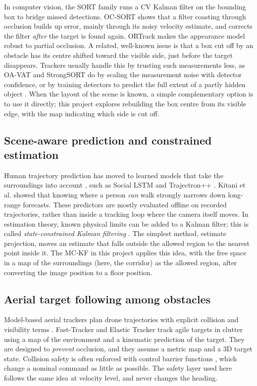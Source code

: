 \documentclass[12pt,a4paper]{article}
\begin{document}
In computer vision, the SORT family \cite{r19,r20,r21} runs a CV Kalman filter on the bounding box to bridge missed detections. OC-SORT \cite{r22} shows that a filter coasting through occlusion builds up error, mainly through its noisy velocity estimate, and corrects the filter \emph{after} the target is found again. ORTrack \cite{r12} makes the appearance model robust to partial occlusion.
A related, well-known issue is that a box cut off by an obstacle has its centre shifted toward the visible side, just before the target disappears.
Trackers usually handle this by trusting such measurements less, as OA-VAT and StrongSORT \cite{strongsort} do by scaling the measurement noise with detector confidence, or by training detectors to predict the full extent of a partly hidden object \cite{amodal}.
When the layout of the scene is known, a simple complementary option is to use it directly; this project explores rebuilding the box centre from its visible edge, with the map indicating which side is cut off.

\subsection{Scene-aware prediction and constrained estimation}
Human trajectory prediction has moved to learned models that take the surroundings into account \cite{r23}, such as Social LSTM \cite{r24} and Trajectron++ \cite{r25}.
Kitani et al. \cite{r26} showed that knowing where a person \emph{can} walk strongly narrows down long-range forecasts.
These predictors are mostly evaluated offline on recorded trajectories, rather than inside a tracking loop where the camera itself moves.
In estimation theory, known physical limits can be added to a Kalman filter; this is called \emph{state-constrained Kalman filtering} \cite{r27}.
The simplest method, estimate projection, moves an estimate that falls outside the allowed region to the nearest point inside it.
The MC-KF in this project applies this idea, with the free space in a map of the surroundings (here, the corridor) as the allowed region, after converting the image position to a floor position.

\subsection{Aerial target following among obstacles}
Model-based aerial trackers plan drone trajectories with explicit collision and visibility terms \cite{r28,r29,r30}. Fast-Tracker \cite{r31} and Elastic Tracker \cite{r32} track agile targets in clutter using a map of the environment \cite{r33} and a kinematic prediction of the target. They are designed to \emph{prevent} occlusion, and they assume a metric map and a 3D target state. Collision safety is often enforced with control barrier functions \cite{r34}, which change a nominal command as little as possible. The safety layer used here follows the same idea at velocity level, and never changes the heading.
\end{document}
